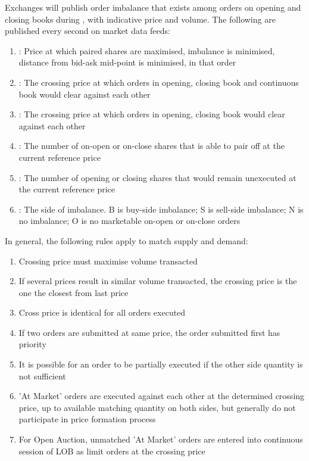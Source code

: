 Exchanges will publish order imbalance that exists among orders on opening and closing books during , with indicative price and volume. The following are published every second on market data feeds:
\begin{enumerate}[label=\roman*.]
\setlength{\itemsep}{0pt}
\item {}: Price at which paired shares are maximised, imbalance is minimised, distance from bid-ask mid-point is minimised, in that order
\item {}: The crossing price at which orders in opening, closing book and continuous book would clear against each other
\item {}: The crossing price at which orders in opening, closing book would clear against each other
\item {}: The number of on-open or on-close shares that is able to pair off at the current reference price
\item {}: The number of opening or closing shares that would remain unexecuted at the current reference price
\item {}: The side of imbalance. B is buy-side imbalance; S is sell-side imbalance; N is no imbalance; O is no marketable on-open or on-close orders
\end{enumerate}

In general, the following rules apply to match supply and demand:
\begin{enumerate}[label=\roman*.]
\setlength{\itemsep}{0pt}
\item Crossing price must maximise volume transacted
\item If several prices result in similar volume transacted, the crossing price is the one the closest from last price
\item Cross price is identical for all orders executed
\item If two orders are submitted at same price, the order submitted first has priority
\item It is possible for an order to be partially executed if the other side quantity is not sufficient
\item 'At Market' orders are executed against each other at the determined crossing price, up to available matching quantity on both sides, but generally do not participate in price formation process
\item For Open Auction, unmatched 'At Market' orders are entered into continuous session of LOB as limit orders at the crossing price
\end{enumerate}

